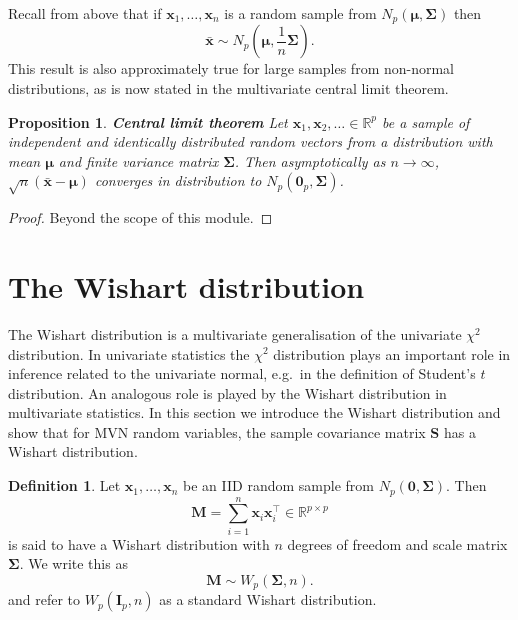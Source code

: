 \documentclass[]{book}
\newtheorem{proposition}{Proposition}[chapter]
\theoremstyle{definition}
\newtheorem{definition}{Definition}[chapter]
\theoremstyle{definition}
\theoremstyle{definition}
\theoremstyle{remark}
\begin{document}
Recall from above that if \(\boldsymbol x_1, \ldots, \boldsymbol x_n\) is a random sample from \(N_p(\boldsymbol \mu, \boldsymbol \Sigma)\) then \[\bar{\boldsymbol x} \sim N_p (\boldsymbol \mu, \frac{1}{n}\boldsymbol \Sigma).\] This result is also approximately true for large samples from non-normal distributions, as is now stated in the multivariate central limit theorem.

\begin{proposition}
\protect\hypertarget{prp:clt}{}{\label{prp:clt} }\textbf{Central limit theorem} Let \(\boldsymbol x_1, \boldsymbol x_2, \ldots \in \mathbb{R}^p\) be a sample of independent and identically distributed random vectors from a distribution with mean \(\boldsymbol \mu\) and finite variance matrix \(\boldsymbol \Sigma\). Then asymptotically as \(n \rightarrow \infty\), \(\sqrt{n}(\bar{\boldsymbol x}-\boldsymbol \mu)\) converges in distribution to \(N_p ({\mathbf 0}_p, \boldsymbol \Sigma)\).
\end{proposition}

\begin{proof}
{}Beyond the scope of this module.
\end{proof}

\hypertarget{the-wishart-distribution}{%
\section{The Wishart distribution}\label{the-wishart-distribution}}

The Wishart distribution is a multivariate generalisation of the univariate \(\chi^2\) distribution. In univariate statistics the \(\chi^2\) distribution plays an important role in inference related to the univariate normal, e.g.~in the definition of Student's \(t\) distribution. An analogous role is played by the Wishart distribution in multivariate statistics. In this section we introduce the Wishart distribution and show that for MVN random variables, the sample covariance matrix \(\boldsymbol S\) has a Wishart distribution.

\begin{definition}
\protect\hypertarget{def:wishart}{}{\label{def:wishart} } Let \(\boldsymbol x_1, \ldots, \boldsymbol x_n\) be an IID random sample from \(N_p (\boldsymbol 0, \boldsymbol \Sigma)\). Then \[\boldsymbol M= \sum_{i=1}^n \boldsymbol x_i \boldsymbol x_i^\top \in \mathbb{R}^{p\times p}\]
is said to have a Wishart distribution with \(n\) degrees of freedom and scale matrix \(\boldsymbol \Sigma\). We write this as
\[\boldsymbol M\sim W_p(\boldsymbol \Sigma, n).\]
and refer to \(W_p(\mathbf I_p,n)\) as a standard Wishart distribution.
\end{definition}
\end{document}
